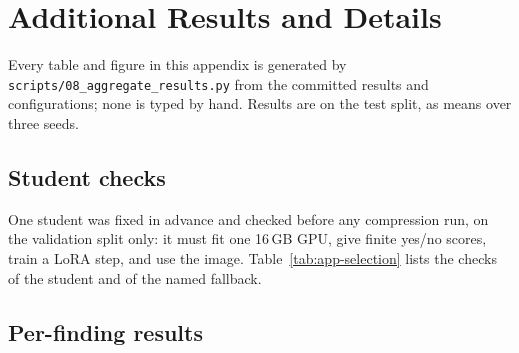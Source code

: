 \section{Additional Results and Details}
\label{sec:appendix}

Every table and figure in this appendix is generated by
\texttt{scripts/08\_aggregate\_results.py} from the committed results and configurations;
none is typed by hand. Results are on the test split, as means over three seeds.

\subsection{Student checks}
\label{app:student-selection}
One student was fixed in advance and checked before any compression run, on the validation
split only: it must fit one 16\,GB GPU, give finite yes/no scores, train a LoRA step, and use
the image. Table~\ref{tab:app-selection} lists the checks of the student and of the named
fallback.

\begin{table}[h]
  \centering
  \caption{Round 0 checks of the candidate students (validation split only).}
  \label{tab:app-selection}
  \resizebox{\linewidth}{!}{}
\end{table}

\subsection{Per-finding results}
\begin{table}[h]
  \centering
  \caption{Sensitivity per finding (arms at B2 where budget-matched).}
  \resizebox{\linewidth}{!}{}
\end{table}
\begin{table}[h]
  \centering
  \caption{Specificity per finding (arms at B2 where budget-matched).}
  \resizebox{\linewidth}{!}{}
\end{table}
\begin{table}[h]
  \centering
  \caption{AUROC per finding from the probe scores (log P(yes) $-$ log P(no)), which does not
  depend on the yes/no threshold (arms at B2 where budget-matched).}
  \resizebox{\linewidth}{!}{}
\end{table}
\begin{table}[h]
  \centering
  \caption{Rate of ``yes'' answers per finding: with the AUROC it separates a shift of the
  yes/no bias from a loss of discrimination (arms at B2 where budget-matched).}
  \resizebox{\linewidth}{!}{}
\end{table}

